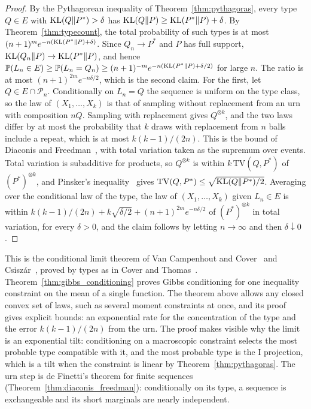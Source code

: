 \begin{proof}
By the Pythagorean inequality of Theorem~\ref{thm:pythagoras}, every type $Q\in E$ with $\mathrm{KL}(Q\|P^*)>\delta$ has $\mathrm{KL}(Q\|P)\geq\mathrm{KL}(P^*\|P)+\delta$. By Theorem~\ref{thm:typecount}, the total probability of such types is at most $(n+1)^me^{-n(\mathrm{KL}(P^*\|P)+\delta)}$. Since $Q_n\to P^*$ and $P$ has full support, $\mathrm{KL}(Q_n\|P)\to\mathrm{KL}(P^*\|P)$, and hence $\mathbb{P}(L_n\in E)\geq\mathbb{P}(L_n = Q_n)\geq(n+1)^{-m}e^{-n(\mathrm{KL}(P^*\|P)+\delta/2)}$ for large $n$. The ratio is at most $(n+1)^{2m}e^{-n\delta/2}$, which is the second claim. For the first, let $Q\in E\cap\mathcal{P}_n$. Conditionally on $L_n = Q$ the sequence is uniform on the type class, so the law of $(X_1,\dots,X_k)$ is that of sampling without replacement from an urn with composition $nQ$. Sampling with replacement gives $Q^{\otimes k}$, and the two laws differ by at most the probability that $k$ draws with replacement from $n$ balls include a repeat, which is at most $k(k-1)/(2n)$. This is the bound of Diaconis and Freedman~\cite{diaconisfreedman1980}, with total variation taken as the supremum over events. Total variation is subadditive for products, so $Q^{\otimes k}$ is within $k\,\mathrm{TV}(Q,P^*)$ of $(P^*)^{\otimes k}$, and Pinsker's inequality~\cite[Lemma~11.6.1]{covertomas} gives $\mathrm{TV}(Q,P^*)\leq\sqrt{\mathrm{KL}(Q\|P^*)/2}$. Averaging over the conditional law of the type, the law of $(X_1,\dots,X_k)$ given $L_n\in E$ is within $k(k-1)/(2n)+k\sqrt{\delta/2}+(n+1)^{2m}e^{-n\delta/2}$ of $(P^*)^{\otimes k}$ in total variation, for every $\delta>0$, and the claim follows by letting $n\to\infty$ and then $\delta\downarrow0$.
\end{proof}

This is the conditional limit theorem of Van Campenhout and Cover~\cite{vancampenhoutcover1981} and Csisz\'ar~\cite{csiszar1984}, proved by types as in Cover and Thomas~\cite[Section~11.6]{covertomas}. Theorem~\ref{thm:gibbs_conditioning} proves Gibbs conditioning for one inequality constraint on the mean of a single function. The theorem above allows any closed convex set of laws, such as several moment constraints at once, and its proof gives explicit bounds: an exponential rate for the concentration of the type and the error $k(k-1)/(2n)$ from the urn. The proof makes visible why the limit is an exponential tilt: conditioning on a macroscopic constraint selects the most probable type compatible with it, and the most probable type is the I projection, which is a tilt when the constraint is linear by Theorem~\ref{thm:pythagoras}. The urn step is de Finetti's theorem for finite sequences~\cite{diaconisfreedman1980} (Theorem~\ref{thm:diaconis_freedman}): conditionally on its type, a sequence is exchangeable and its short marginals are nearly independent.


